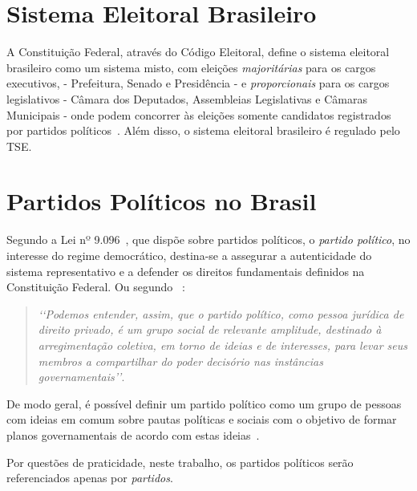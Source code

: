 
\section{Sistema Eleitoral Brasileiro}

A Constituição Federal, através do Código Eleitoral, define o sistema eleitoral brasileiro como um sistema misto, com eleições \emph{majoritárias} para os cargos executivos, - Prefeitura, Senado e Presidência - e \emph{proporcionais} para os cargos legislativos - Câmara dos Deputados, Assembleias Legislativas e Câmaras Municipais - onde podem concorrer às eleições somente candidatos registrados por partidos políticos~\cite{brasil1965lei4737}. Além disso, o sistema eleitoral brasileiro é regulado pelo \gls{TSE}.

\section{Partidos Políticos no Brasil}
\label{conceitos__partidos-brasil}
    
Segundo a  Lei nº 9.096~\cite{brasil1995lei9096}, que dispõe sobre partidos políticos, o \emph{partido político}, no interesse do regime democrático, destina-se a assegurar a autenticidade do sistema representativo e a defender os direitos fundamentais definidos na Constituição Federal. Ou segundo ~\cite{michels2006direito}:

\begin{quotation}
    \emph{‘‘Podemos entender, assim, que o partido político, como pessoa jurídica de direito privado, é um grupo social de relevante amplitude, destinado à arregimentação coletiva, em torno de ideias e de interesses, para levar seus membros a compartilhar do poder decisório nas instâncias governamentais’’}.
\end{quotation}

De modo geral, é possível definir um partido político como um grupo de pessoas com ideias em comum sobre pautas políticas e sociais com o objetivo de formar planos governamentais de acordo com estas ideias~\cite{garibaldi2017partidos}.

Por questões de praticidade, neste trabalho, os partidos políticos serão referenciados apenas por \emph{partidos}. 

